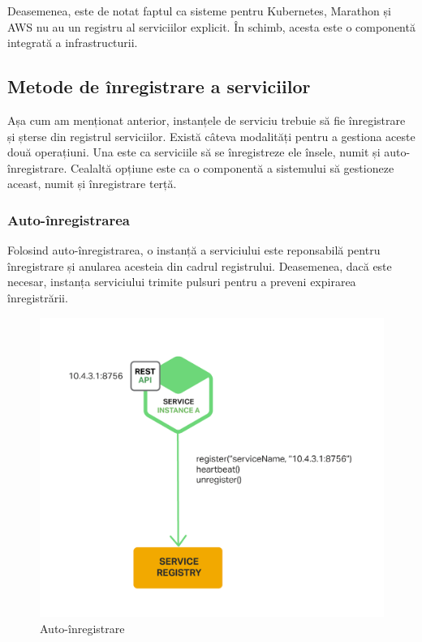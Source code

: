 \documentclass[12pt, a4paper, oneside, romanian]{teza-upb}
\begin{document}
Deasemenea, este de notat faptul ca sisteme pentru Kubernetes, Marathon și AWS nu au un registru al serviciilor explicit. În schimb, acesta este o componentă integrată a infrastructurii.

\subsection{Metode de înregistrare a serviciilor}

Așa cum am menționat anterior, instanțele de serviciu trebuie să fie înregistrare și șterse din registrul serviciilor. Există câteva modalități pentru a gestiona aceste două operațiuni. Una este ca serviciile să se înregistreze ele însele, numit și auto-înregistrare. Cealaltă opțiune este ca o componentă a sistemului să gestioneze aceast, numit și înregistrare terță.

\subsubsection{Auto-înregistrarea}
Folosind auto-înregistrarea, o instanță a serviciului este reponsabilă pentru înregistrare și anularea acesteia din cadrul registrului. Deasemenea, dacă este necesar, instanța serviciului trimite pulsuri pentru a preveni expirarea înregistrării.

\begin{figure}[ht]
\centering
\includegraphics[scale=0.3]{img/Richardson-microservices-part4-4_self-registration-pattern.png}
\caption{Auto-înregistrare}
\label{fig:arhi_componente}
\end{figure}
\end{document}
